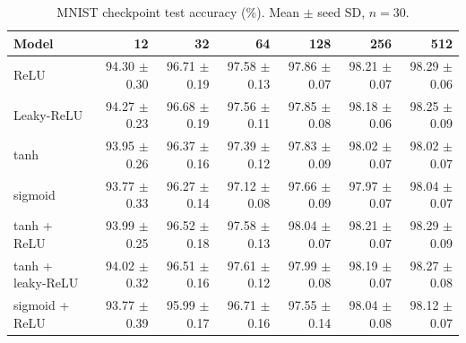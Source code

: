 \begin{table}[htbp]
\centering
\caption{MNIST checkpoint test accuracy (\%). Mean $\pm$ seed SD, $n=30$.}
\label{tab:mnist:test_acc_best}
\footnotesize
\begin{tabular}{@{}lrrrrrr@{}}
\toprule
Model & 12 & 32 & 64 & 128 & 256 & 512 \\
\midrule
ReLU & 94.30 $\pm$ 0.30 & 96.71 $\pm$ 0.19 & 97.58 $\pm$ 0.13 & 97.86 $\pm$ 0.07 & 98.21 $\pm$ 0.07 & 98.29 $\pm$ 0.06 \\
Leaky-ReLU & 94.27 $\pm$ 0.23 & 96.68 $\pm$ 0.19 & 97.56 $\pm$ 0.11 & 97.85 $\pm$ 0.08 & 98.18 $\pm$ 0.06 & 98.25 $\pm$ 0.09 \\
tanh & 93.95 $\pm$ 0.26 & 96.37 $\pm$ 0.16 & 97.39 $\pm$ 0.12 & 97.83 $\pm$ 0.09 & 98.02 $\pm$ 0.07 & 98.02 $\pm$ 0.07 \\
sigmoid & 93.77 $\pm$ 0.33 & 96.27 $\pm$ 0.14 & 97.12 $\pm$ 0.08 & 97.66 $\pm$ 0.09 & 97.97 $\pm$ 0.07 & 98.04 $\pm$ 0.07 \\
tanh + ReLU & 93.99 $\pm$ 0.25 & 96.52 $\pm$ 0.18 & 97.58 $\pm$ 0.13 & 98.04 $\pm$ 0.07 & 98.21 $\pm$ 0.07 & 98.29 $\pm$ 0.09 \\
tanh + leaky-ReLU & 94.02 $\pm$ 0.32 & 96.51 $\pm$ 0.16 & 97.61 $\pm$ 0.12 & 97.99 $\pm$ 0.08 & 98.19 $\pm$ 0.07 & 98.27 $\pm$ 0.08 \\
sigmoid + ReLU & 93.77 $\pm$ 0.39 & 95.99 $\pm$ 0.17 & 96.71 $\pm$ 0.16 & 97.55 $\pm$ 0.14 & 98.04 $\pm$ 0.08 & 98.12 $\pm$ 0.07 \\
\bottomrule
\end{tabular}
\par{}
\end{table}
